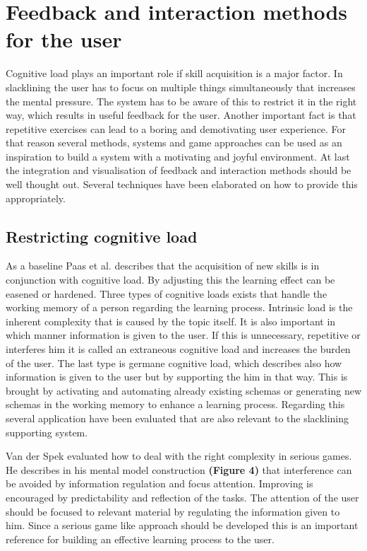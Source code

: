\section{Feedback and interaction methods for the user}

Cognitive load plays an important role if skill acquisition is a major factor. In slacklining the user has to focus on multiple things simultaneously that increases the mental pressure. The system has to be aware of this to restrict it in the right way, which results in useful feedback for the user. Another important fact is that repetitive exercises can lead to a boring and demotivating user experience. For that reason several methods, systems and game approaches can be used as an inspiration to build a system with a motivating and joyful environment. At last the integration and visualisation of feedback and interaction methods should be well thought out. Several techniques have been elaborated on how to provide this appropriately.

\subsection{Restricting cognitive load}

As a baseline Paas et al. \cite{Paas2003-xt} describes that the acquisition of new skills is in conjunction with cognitive load. By adjusting this the learning effect can be easened or hardened. Three types of cognitive loads exists that handle the working memory of a person regarding the learning process. Intrinsic load is the inherent complexity that is caused by the topic itself. It is also important in which manner information is given to the user. If this is unnecessary, repetitive or interferes him it is called an extraneous cognitive load and increases the burden of the user. The last type is germane cognitive load, which describes also how information is given to the user but by supporting the him in that way. This is brought by activating and automating already existing schemas or generating new schemas in the working memory to enhance a learning process. Regarding this several application have been evaluated that are also relevant to the slacklining supporting system.

Van der Spek \cite{Van_der_Spek2010-fe} evaluated how to deal with the right complexity in serious games. He describes in his mental model construction \textbf{(Figure 4)} that interference can be avoided by information regulation and focus attention. Improving is encouraged by predictability and reflection of the tasks. The attention of the user should be focused to relevant material by regulating the information given to him. Since a serious game like approach should be developed this is an important reference for building an effective learning process to the user.

